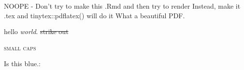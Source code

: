\documentclass{article}
\begin{document}
NOOPE - Don't try to make this .Rmd and then try to render
Instead, make it .tex and tinytex::pdflatex() will do it
What a beautiful PDF.

hello \emph{world}.
\sout{strike out}    %

\textsc{small caps}

\color{blue}   Is this blue.:   

\end{document}

